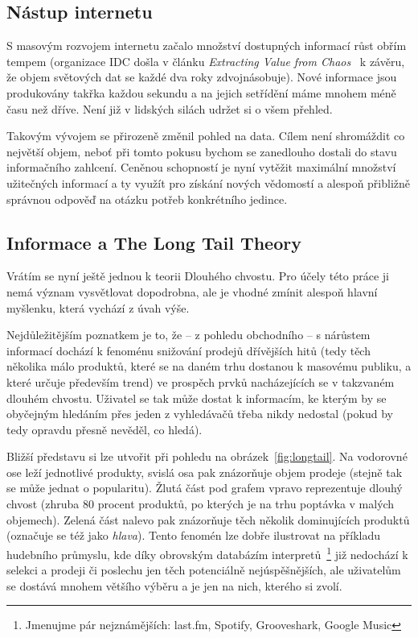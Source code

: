 \documentclass[thesis=M,czech]{FITthesis}[2014/05/07]
\begin{document}
\begin{introduction}
\subsection{Nástup internetu}		
	S masovým rozvojem internetu začalo množství dostupných informací růst obřím tempem (organizace IDC došla v článku \emph{Extracting Value from Chaos}~\cite{digitaluniverse} k závěru, že objem světových dat se každé dva roky zdvojnásobuje). Nové informace jsou produkovány takřka každou sekundu a na jejich setřídění máme mnohem méně času než dříve. Není již v lidských silách udržet si o všem přehled.
	
	Takovým vývojem se přirozeně změnil pohled na data. Cílem není shromáždit co největší objem, neboť při tomto pokusu bychom se zanedlouho dostali do stavu informačního zahlcení. Ceněnou schopností je nyní vytěžit maximální množství užitečných informací a ty využít pro získání nových vědomostí a alespoň přibližně správnou odpověď na otázku potřeb konkrétního jedince.
	
\subsection{Informace a The Long Tail Theory}	
	\label{sub:ltl}
	Vrátím se nyní ještě jednou k teorii Dlouhého chvostu. Pro účely této práce ji nemá význam vysvětlovat dopodrobna, ale je vhodné zmínit alespoň hlavní myšlenku, která vychází z úvah výše.
	
	Nejdůležitějším poznatkem je to, že – z pohledu obchodního – s nárůstem informací dochází k fenoménu snižování prodejů dřívějších hitů (tedy těch několika málo produktů, které se na daném trhu dostanou k masovému publiku, a které určuje především trend) ve prospěch prvků nacházejících se v takzvaném dlouhém chvostu. Uživatel se tak může dostat k informacím, ke kterým by se obyčejným hledáním přes jeden z vyhledávačů třeba nikdy nedostal (pokud by tedy opravdu přesně nevěděl, co hledá).
	
	Bližší představu si lze utvořit při pohledu na obrázek~\ref{fig:longtail}. Na vodorovné ose leží jednotlivé produkty, svislá osa pak znázorňuje objem prodeje (stejně tak se může jednat o popularitu). Žlutá část pod grafem vpravo reprezentuje dlouhý chvost (zhruba 80 procent produktů, po kterých je na trhu poptávka v malých objemech). Zelená část nalevo pak znázorňuje těch několik dominujících produktů (označuje se též jako \emph{hlava}). Tento fenomén lze dobře ilustrovat na příkladu hudebního průmyslu, kde díky obrovským databázím interpretů~\footnote{Jmenujme pár nejznámějších: last.fm, Spotify, Grooveshark, Google Music} již nedochází k selekci a prodeji či poslechu jen těch potenciálně nejúspěšnějších, ale uživatelům se dostává mnohem většího výběru a je jen na nich, kterého si zvolí.
	

\end{introduction}
\end{document}
